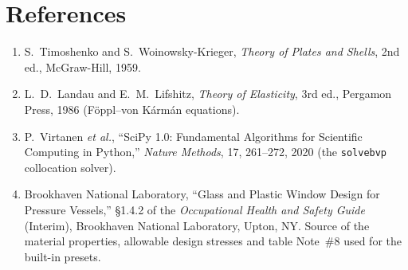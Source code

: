 \documentclass[11pt]{article}
\newcommand{\codeus}{\textunderscore\allowbreak}
\DeclareRobustCommand{\code}[1]{\texttt{\ifmmode\else\renewcommand{\_}{\codeus}\fi#1}}
\begin{document}
\section{References}

\begin{enumerate}[noitemsep]
  \item S.~Timoshenko and S.~Woinowsky-Krieger, \emph{Theory of Plates and
    Shells}, 2nd ed., McGraw-Hill, 1959.
  \item L.~D.~Landau and E.~M.~Lifshitz, \emph{Theory of Elasticity},
    3rd ed., Pergamon Press, 1986 (F\"oppl--von K\'arm\'an equations).
  \item P.~Virtanen \emph{et al.}, ``SciPy 1.0: Fundamental Algorithms for
    Scientific Computing in Python,'' \emph{Nature Methods}, 17, 261--272, 2020
    (the \code{solve\_bvp} collocation solver).
  \item Brookhaven National Laboratory, ``Glass and Plastic Window Design for
    Pressure Vessels,'' \S1.4.2 of the \emph{Occupational Health and Safety
    Guide} (Interim), Brookhaven National Laboratory, Upton, NY. Source of the
    material properties, allowable design stresses and table Note~\#8 used for
    the built-in presets.\label{ref:bnl}
\end{enumerate}
\end{document}
